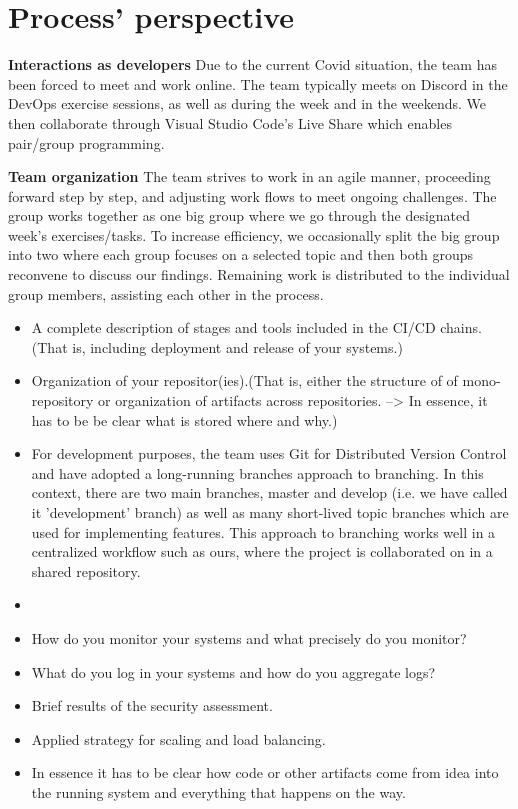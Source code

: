 \section{Process' perspective}

\textbf{Interactions as developers}\newline
  Due to the current Covid situation, the team has been forced to meet and work online. The team typically meets on Discord in the DevOps
  exercise sessions, as well as during the week and in the weekends. We then collaborate through Visual Studio Code's Live Share which enables pair/group programming. 
  \newline
 
\textbf{Team organization}\newline
  The team strives to work in an agile manner, proceeding forward step by step, and adjusting work flows to meet ongoing challenges. The group works together as one big group where we go through the designated week's exercises/tasks. 
  To increase efficiency, we occasionally split the big group into two where each group focuses on a selected topic
  and then both groups reconvene to discuss our findings. Remaining work is distributed to the individual group members, assisting each other in the process.

  
  \begin{itemize}
  \item A complete description of stages and tools included in the CI/CD chains.(That is, including deployment and release of your systems.)
  \item Organization of your repositor(ies).(That is, either the structure of of mono-repository or organization of artifacts across repositories. --> In essence, it has to be be clear what is stored where and why.) 
  \item For development purposes, the team uses Git for Distributed Version Control and have adopted a long-running branches approach to branching. In this context, there are two main branches, master and develop 
  (i.e. we have called it 'development' branch) as well as many short-lived topic branches which are used for implementing features. This approach to branching works well in a centralized workflow such as ours, where the project is collaborated on in a shared
  repository.
  \item 
  \item How do you monitor your systems and what precisely do you monitor?
  \item What do you log in your systems and how do you aggregate logs?
  \item Brief results of the security assessment.
  \item Applied strategy for scaling and load balancing.
  \item In essence it has to be clear how code or other artifacts come from idea into the running system and everything that happens on the way.
  
\end{itemize}
